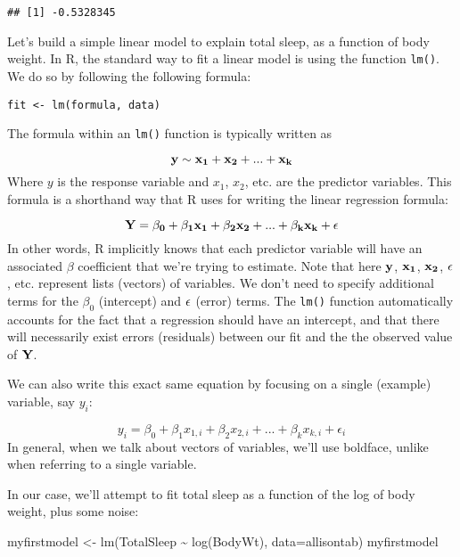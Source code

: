 \documentclass[
]{book}
\newenvironment{Shaded}{\begin{snugshade}}{\end{snugshade}}
\newcommand{\AttributeTok}[1]{\textcolor[rgb]{0.77,0.63,0.00}{#1}}
\newcommand{\FunctionTok}[1]{\textcolor[rgb]{0.00,0.00,0.00}{#1}}
\newcommand{\NormalTok}[1]{#1}
\newcommand{\OtherTok}[1]{\textcolor[rgb]{0.56,0.35,0.01}{#1}}
\newcommand{\SpecialCharTok}[1]{\textcolor[rgb]{0.00,0.00,0.00}{#1}}
\begin{document}
\begin{verbatim}
## [1] -0.5328345
\end{verbatim}

Let's build a simple linear model to explain total sleep, as a function of body weight. In R, the standard way to fit a linear model is using the function \texttt{lm()}. We do so by following the following formula:

\texttt{fit\ \textless{}-\ lm(formula,\ data)}

The formula within an \texttt{lm()} function is typically written as

\[\bf{y} \sim \bf{x_1} + \bf{x_2} + ... + \bf{x_k}\] Where \(y\) is the response variable and \(x_1\), \(x_2\), etc. are the predictor variables. This formula is a shorthand way that R uses for writing the linear regression formula:

\[\bf{Y} = \beta_0 + \beta_1 \bf{x_1} + \beta_2 \bf{x_2} + ... + \beta_k \bf{x_k} + \bf{\epsilon}\] In other words, R implicitly knows that each predictor variable will have an associated \(\beta\) coefficient that we're trying to estimate. Note that here \(\bf{y}\), \(\bf{x_1}\), \(\bf{x_2}\), \(\bf{\epsilon}\), etc. represent lists (vectors) of variables. We don't need to specify additional terms for the \(\beta_0\) (intercept) and \(\bf{\epsilon}\) (error) terms. The \texttt{lm()} function automatically accounts for the fact that a regression should have an intercept, and that there will necessarily exist errors (residuals) between our fit and the the observed value of \(\bf{Y}\).

We can also write this exact same equation by focusing on a single (example) variable, say \(y_i\):

\[y_i = \beta_0 + \beta_1 x_{1,i} + \beta_2 x_{2,i} + ... + \beta_k x_{k,i} + \epsilon_i\] In general, when we talk about vectors of variables, we'll use boldface, unlike when referring to a single variable.

In our case, we'll attempt to fit total sleep as a function of the log of body weight, plus some noise:

\begin{Shaded}
\begin{Highlighting}[]
\NormalTok{myfirstmodel }\OtherTok{\textless{}{-}} \FunctionTok{lm}\NormalTok{(TotalSleep }\SpecialCharTok{\textasciitilde{}} \FunctionTok{log}\NormalTok{(BodyWt), }\AttributeTok{data=}\NormalTok{allisontab) }
\NormalTok{myfirstmodel}
\end{Highlighting}
\end{Shaded}
\end{document}
